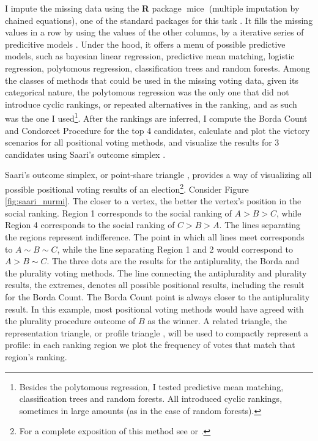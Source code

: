 \documentclass[hidelinks,11pt]{article}
\begin{document}
I impute the missing data using the \textbf{\textsf{R}} package
\(\operatorname{mice}\) (multiple imputation by chained equations), one of the
standard packages for this task \parencite{van2011mice}. It fills the missing
values in a row by using the values of the other columns, by a iterative series
of predicitive models \parencite{vanbuuren2018imputation}. Under the hood, it
offers a menu of possible predictive models, such as bayesian linear regression,
predictive mean matching, logistic regression, polytomous regression,
classification trees and random forests. Among the classes of methods that could
be used in the missing voting data, given its categorical nature, the polytomous
regression was the only one that did not introduce cyclic rankings, or repeated
alternatives in the ranking, and as such was the one I used\footnote{Besides the
  polytomous regression, I tested predictive mean matching, classification trees
  and random forests. All introduced cyclic rankings, sometimes in large amounts
  (as in the case of random forests).}. After the rankings are inferred, I
compute the Borda Count and Condorcet Procedure for the top 4 candidates,
calculate and plot the victory scenarios for all positional voting methods, and
visualize the results for 3 candidates using Saari's outcome simplex
\parencite{saari2012geometry}.


Saari's outcome simplex, or point-share triangle
\parencite{eggers20_diagr_analy_ordin_votin_system}, provides a way of
visualizing all possible positional voting results of an election\footnote{For a
  complete exposition of this method see \textcite{saari1995basic} or
  \textcite{nurmi2002voting}.}. Consider Figure \ref{fig:saari_nurmi}. The
closer to a vertex, the better the vertex's position in the social ranking.
Region 1 corresponds to the social ranking of \(A > B > C\), while Region 4
corresponds to the social ranking of \(C>B>A\). The lines separating the regions
represent indifference. The point in which all lines meet corresponds to
\(A \sim B \sim C\), while the line separating Region 1 and 2 would correspond
to \(A > B \sim C\). The three dots are the results for the antiplurality, the
Borda and the plurality voting methods. The line connecting the antiplurality
and plurality results, the extremes, denotes all possible positional results,
including the result for the Borda Count. The Borda Count point is always closer
to the antiplurality result. In this example, most positional voting methods
would have agreed with the plurality procedure outcome of \(B\) as the winner. A
related triangle, the representation triangle, or profile triangle
\parencite{eggers20_diagr_analy_ordin_votin_system}, will be used to compactly
represent a profile: in each ranking region we plot the frequency of votes that
match that region's ranking.
\end{document}
